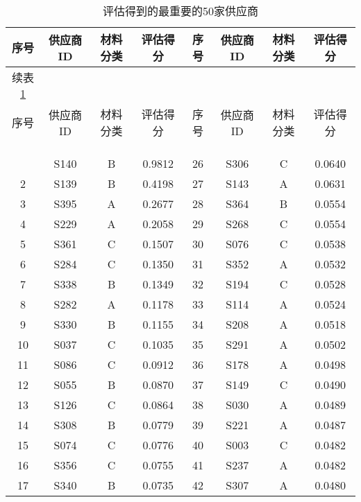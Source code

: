 \documentclass[11pt, fontset = windows]{article}
\begin{document}
\begin{center}
    \begin{longtable}{cccc||cccc}
        \toprule
        序号 & 供应商ID & 材料分类 & 评估得分   & 序号 & 供应商ID & 材料分类 & 评估得分   \\ \midrule
        \endfirsthead
        续表 \ref{供应商列表}\\
        \toprule
        序号 & 供应商ID & 材料分类 & 评估得分   & 序号 & 供应商ID & 材料分类 & 评估得分   \\ \midrule
        \endhead
        \caption{评估得到的最重要的50家供应商}\\
        \label{供应商列表}\\
        \endlastfoot
        \bottomrule\\
        \endfoot
        1  & S140  & B    & 0.9812 & 26 & S306  & C    & 0.0640 \\
        2  & S139  & B    & 0.4198 & 27 & S143  & A    & 0.0631 \\
        3  & S395  & A    & 0.2677 & 28 & S364  & B    & 0.0554 \\
        4  & S229  & A    & 0.2058 & 29 & S268  & C    & 0.0554 \\
        5  & S361  & C    & 0.1507 & 30 & S076  & C    & 0.0538 \\
        6  & S284  & C    & 0.1350 & 31 & S352  & A    & 0.0532 \\
        7  & S338  & B    & 0.1349 & 32 & S194  & C    & 0.0528 \\
        8  & S282  & A    & 0.1178 & 33 & S114  & A    & 0.0524 \\
        9  & S330  & B    & 0.1155 & 34 & S208  & A    & 0.0518 \\
        10 & S037  & C    & 0.1035 & 35 & S291  & A    & 0.0502 \\
        11 & S086  & C    & 0.0912 & 36 & S178  & A    & 0.0498 \\
        12 & S055  & B    & 0.0870 & 37 & S149  & C    & 0.0490 \\
        13 & S126  & C    & 0.0864 & 38 & S030  & A    & 0.0489 \\
        14 & S308  & B    & 0.0779 & 39 & S221  & A    & 0.0487 \\
        15 & S074  & C    & 0.0776 & 40 & S003  & C    & 0.0482 \\
        16 & S356  & C    & 0.0755 & 41 & S237  & A    & 0.0482 \\
        17 & S340  & B    & 0.0735 & 42 & S307  & A    & 0.0480 \\

\end{longtable}
\end{center}
\end{document}
